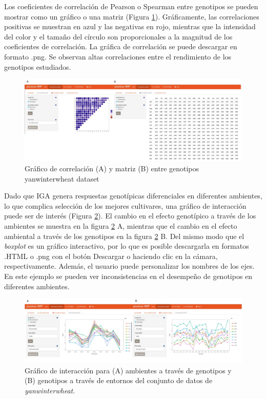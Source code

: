 Los coeficientes de correlación de Pearson o Spearman entre genotipos se pueden mostrar como un gráfico o una matriz (Figura \ref{fig:figdesc2}). Gráficamente, las correlaciones positivas se muestran en azul y las negativas en rojo, mientras que la intensidad del color y el tamaño del círculo son proporcionales a la magnitud de los coeficientes de correlación. La gráfica de correlación se puede descargar en formato .png. Se observan altas correlaciones entre el rendimiento de los genotipos estudiados. 

\begin{figure}[H]
	\begin{center}
		\includegraphics[width=16cm]{./Graficos/correlacion.jpg}
	\end{center}
	\caption{Gráfico de correlación (A) y matriz (B) entre genotipos yanwinterwheat dataset }
	\label{fig:figdesc2}
\end{figure}


Dado que IGA genera respuestas genotípicas diferenciales en diferentes ambientes, lo que complica selección de los mejores cultivares, una gráfico de interacción puede ser de interés (Figura \ref{fig:figdesc3}). El cambio en el efecto genotípico a través de los ambientes se muestra en la figura \ref{fig:figdesc3} A, mientras que el cambio en el efecto ambiental a través de los genotipos en la figura \ref{fig:figdesc3} B. Del mismo modo que el \emph{boxplot} es un gráfico interactivo, por lo que es posible descargarla en formatos .HTML o .png con el botón Descargar o haciendo clic en la cámara, respectivamente. Además, el usuario puede personalizar los nombres de los ejes. En este ejemplo se pueden ver inconsistencias en el desempeño de genotipos en diferentes ambientes. 


\begin{figure}[H]
	\begin{center}
		\includegraphics[width=16cm]{./Graficos/interaction.jpg}
	\end{center}
	\caption{Gráfico de interacción para (A) ambientes a través de genotipos y (B) genotipos a través de entornos del conjunto de datos de \emph{yanwinterwheat}.}
	\label{fig:figdesc3}
\end{figure}


